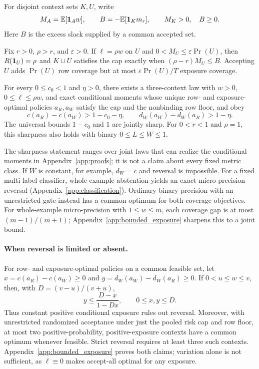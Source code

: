 For disjoint context sets $K,U$, write
\[
 M_A=\mathbb{E}[\mathbf{1}_Aw],\qquad B=-\mathbb{E}[\mathbf{1}_Km_r],\qquad
 M_K>0,\quad B\geq0.
\]
Here $B$ is the excess slack supplied by a common accepted set.
\begin{proposition}
\label{prop:lowdemand}
Fix $r>0$, $\rho>r$, and $\varepsilon>0$. If $\ell=\rho w$ on $U$ and
$0<M_U\leq\varepsilon\Pr(U)$, then $R(\mathbf{1}_U)=\rho$ and
$K\cup U$ satisfies the cap exactly when $(\rho-r)M_U\leq B$.
Accepting $U$ adds $\Pr(U)$ row coverage but at most
$\varepsilon\Pr(U)/T$ exposure coverage.

For every $0\leq c_0<1$ and $\eta>0$, there exists a three-context
law with $w>0$, $0\leq\ell\leq\rho w$, and exact conditional moments
whose unique row- and exposure-optimal policies $a_R,a_W$ satisfy
the cap and the nonbinding row floor, and obey
\[
 c(a_R)-c(a_W)>1-c_0-\eta,\qquad
 d_W(a_W)-d_W(a_R)>1-\eta.
\]
The universal bounds $1-c_0$ and $1$ are jointly sharp. For
$0<r<1$ and $\rho=1$, this sharpness also holds with binary $0\leq L\leq W\leq1$.
\end{proposition}
The sharpness statement ranges over joint laws that can realize the
conditional moments in Appendix~\ref{app:proofs}; it is not a claim
about every fixed metric class. If $W$ is constant, for example,
$d_W=c$ and reversal is impossible. For a fixed multi-label classifier, whole-example abstention yields an exact micro-precision reversal (Appendix~\ref{app:classification}). Ordinary binary precision with an unrestricted gate instead has a common optimum for both coverage objectives. For whole-example micro-precision with $1\leq w\leq m$, each coverage gap is at most $(m-1)/(m+1)$; Appendix~\ref{app:bounded_exposure} sharpens this to a joint bound.

\paragraph{When reversal is limited or absent.}
For row- and exposure-optimal policies on a common feasible set, let
$x=c(a_R)-c(a_W)\geq0$ and $y=d_W(a_W)-d_W(a_R)\geq0$.
If $0<u\leq w\leq v$, then, with $D=(v-u)/(v+u)$,
\begin{equation}
 y\leq\frac{D-x}{1-Dx},\qquad 0\leq x,y\leq D.
 \label{eq:bounded}
\end{equation}
Thus constant positive conditional exposure rules out reversal. Moreover,
with unrestricted randomized acceptance under just the pooled risk cap and row
floor, at most two positive-probability, positive-exposure contexts have a common
optimum whenever feasible. Strict reversal requires at least three such contexts.
Appendix~\ref{app:bounded_exposure} proves both claims; variation alone is not
sufficient, as $\ell\equiv0$ makes accept-all optimal for any exposure.

